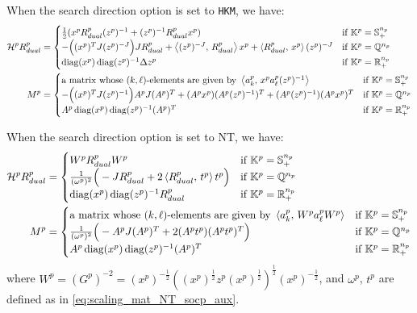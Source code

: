 When the search direction option is set to \texttt{HKM}, we have:
\begin{align}
    \mathcal{H}^p R^p_{dual} &= \begin{cases}
        \frac{1}{2}(x^p R^p_{dual} (z^p)^{-1} + (z^p)^{-1} R^p_{dual} x^p) & \text{if} ~ \mathbb{K}^p=\mathbb{S}^{n_p}_+\\
        - \Big( (x^p)^T J (z^p)^{-J} \Big) J R^p_{dual} + \left\langle (z^p)^{-J}, \, R^p_{dual} \right\rangle x^p + \left\langle R^p_{dual}, \, x^p \right\rangle (z^p)^{-J} & \text{if} ~ \mathbb{K}^p=\mathbb{Q}^{n_p}\\
        \operatorname{diag}(x^p) \operatorname{diag}(z^p)^{-1} \Delta z^p & \text{if} ~ \mathbb{K}^p=\mathbb{R}^{n_p}_+
    \end{cases} \label{eq:HKM_HRd}\\
    M^p &= \begin{cases} 
        \text{a matrix whose $(k,\ell)$-elements are given by } \left\langle a^p_k, \, x^p a^p_\ell (z^p)^{-1} \right\rangle & \text{if} ~ \mathbb{K}^p=\mathbb{S}^{n_p}_+ \\
        -\Big( (x^p)^T J (z^p)^{-1} \Big) A^p J (A^p)^T + (A^p x^p)(A^p (z^p)^{-1})^T + (A^p (z^p)^{-1})(A^p x^p)^T& \text{if} ~ \mathbb{K}^p=\mathbb{Q}^{n_p} \\
        A^p \operatorname{diag}(x^p) \operatorname{diag}(z^p)^{-1} (A^p)^T & \text{if} ~ \mathbb{K}^p=\mathbb{R}^{n_p}_+
    \end{cases}
\end{align}

When the search direction option is set to NT, we have:
\begin{align}
    \mathcal{H}^p R^p_{dual} &= \begin{cases}
        W^p R^p_{dual} W^p & \text{if} ~ \mathbb{K}^p=\mathbb{S}^{n_p}_+ \\
        \frac{1}{(\omega^p)^2} \Big(-J R^p_{dual} + 2\left\langle R^p_{dual}, \, t^p \right\rangle t^p\Big) & \text{if} ~ \mathbb{K}^p=\mathbb{Q}^{n_p}\\
        \operatorname{diag}(x^p) \operatorname{diag}(z^p)^{-1} R^p_{dual} & \text{if} ~ \mathbb{K}^p=\mathbb{R}^{n_p}_+
    \end{cases}\\
    M^p &= \begin{cases}
        \text{a matrix whose $(k,\ell)$-elements are given by } \left\langle a^p_k, \, W^p a^p_\ell W^p \right\rangle & \text{if} ~ \mathbb{K}^p=\mathbb{S}^{n_p}_+\\
        \frac{1}{(\omega^p)^2}\Big(-A^p J (A^p)^T + 2 (A^p t^p)(A^p t^p)^T \Big) & \text{if} ~ \mathbb{K}^p=\mathbb{Q}^{n_p} \\
        A^p \operatorname{diag}(x^p) \operatorname{diag}(z^p)^{-1} (A^p)^T & \text{if} ~ \mathbb{K}^p=\mathbb{R}^{n_p}_+
    \end{cases} \label{eq:NT_M}
\end{align}
where $W^p = (G^p)^{-2} = (x^p)^{-\frac{1}{2}}((x^p)^{\frac{1}{2}} z^p (x^p)^{\frac{1}{2}})^{\frac{1}{2}} (x^p)^{-\frac{1}{2}}$, and $\omega^p$, $t^p$ are defined as in \eqref{eq:scaling_mat_NT_socp_aux}.

